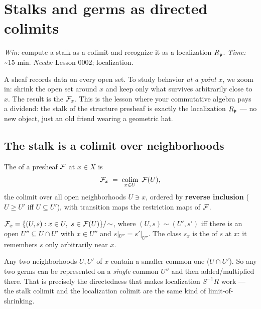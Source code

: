 \chapter{Stalks and germs as directed colimits}\label{ch:ch03-stalks}

\noindent\emph{Win:} compute a stalk as a colimit and recognize it as a localization $R_{\mathfrak{p}}$.\quad
\emph{Time:} \textasciitilde15 min.\quad
\emph{Needs:} Lesson 0002; localization.

\bigskip

A sheaf records data on every open set. To study behavior \emph{at a point} $x$, we zoom in: shrink the
open set around $x$ and keep only what survives arbitrarily close to $x$. The result is the 
$\mathcal{F}_x$. This is the lesson where your commutative algebra pays a dividend: the stalk of the structure
presheaf is exactly the localization $R_{\mathfrak{p}}$ --- no new object, just an old friend wearing a geometric
hat.

\section{The stalk is a colimit over neighborhoods}

\begin{defbox}
The  of a presheaf $\mathcal{F}$ at $x\in X$ is
\[
  \sF_x \;=\; \colim_{x\in U}\ \sF(U),
\]
the colimit over all open neighborhoods $U\ni x$, ordered by \textbf{reverse inclusion}
($U\ge U'$ iff $U\subseteq U'$), with transition maps the restriction maps of $\mathcal{F}$.
\end{defbox}

\begin{defbox}
$\sF_x=\{(U,s):x\in U,\ s\in\sF(U)\}/\!\sim$, where $(U,s)\sim(U',s')$ iff there is an open
$U''\subseteq U\cap U'$ with $x\in U''$ and $s|_{U''}=s'|_{U''}$. The class $s_x$ is the
 of $s$ at $x$: it remembers $s$ only arbitrarily near $x$.
\end{defbox}

\begin{intubox}
Any two neighborhoods $U,U'$ of $x$ contain a smaller common one ($U\cap U'$). So any two germs can be
represented on a \emph{single} common $U''$ and then added/multiplied there. That is precisely the
directedness that makes localization $S^{-1}R$ work --- the stalk colimit and the localization colimit
are the same kind of limit-of-shrinking.
\end{intubox}

